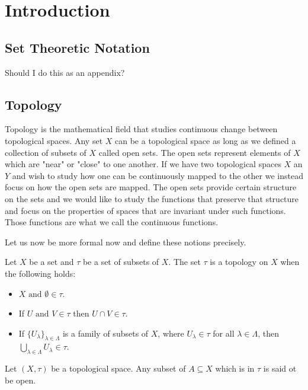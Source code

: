 \chapter{Introduction}
\label{chapter2}

\section{Set Theoretic Notation}
Should I do this as an appendix?

\section{Topology}

Topology is the mathematical field that studies continuous change between topological spaces. Any set $X$ can be a topological space as long as we defined a collection of subsets of $X$ called open sets. The open sets represent elements of $X$ which are "near" or "close" to one another. If we have two topological spaces $X$ an $Y$ and wish to study how one can be continuously mapped to the other we instead focus on how the open sets are mapped. The open sets provide certain structure on the sets and we would like to study the functions that preserve that structure and focus on the properties of spaces that are invariant under such functions. Those functions are what we call the continuous functions.

Let us now be more formal now and define these notions precisely.

\begin{defn} Let $X$ be a set and $\tau$ be a set of subsets of $X$. The set $\tau$ is a topology on $X$ when the following holds:  \end{defn}

\begin{itemize}
    \item $X \text{ and } \emptyset \in \tau$.
    \item If $U \text{ and } V \in \tau$ then $U \cap V \in \tau$.
    \item If $\{U_\lambda\}_{\lambda \in \Lambda}$ is a family of subsets of $X$, where $U_\lambda \in \tau$ for all $\lambda \in \Lambda$, then 
        $\bigcup_{\lambda \in \Lambda}{U_\lambda} \in \tau$.
\end{itemize}

\begin{defn} Let $(X, \tau)$ be a topological space. Any subset of $A \subseteq X$ which is in $\tau$ is said ot be open.  \end{defn}


